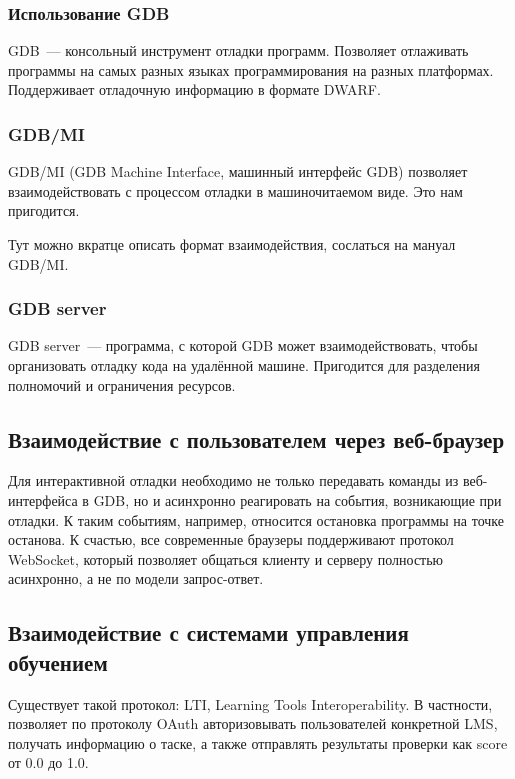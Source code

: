 \documentclass[a4paper,article,14pt]{extarticle}
\begin{document}
\subsubsection{Использование GDB}

GDB~--- консольный инструмент отладки программ. Позволяет отлаживать программы на самых разных языках программирования на разных платформах. Поддерживает отладочную информацию в формате DWARF.

\subsubsection{GDB/MI}

GDB/MI (GDB Machine Interface, машинный интерфейс GDB) позволяет взаимодействовать с процессом отладки в машиночитаемом виде. Это нам пригодится.

Тут можно вкратце описать формат взаимодействия, сослаться на мануал GDB/MI.

\subsubsection{GDB server}

GDB server~--- программа, с которой GDB может взаимодействовать, чтобы организовать отладку кода на удалённой машине. Пригодится для разделения полномочий и ограничения ресурсов.

\subsection{Взаимодействие с пользователем через веб-браузер}

Для интерактивной отладки необходимо не только передавать команды из веб-интерфейса в GDB, но и асинхронно реагировать на события, возникающие при отладки. К таким событиям, например, относится остановка программы на точке останова. К счастью, все современные браузеры поддерживают протокол WebSocket, который позволяет общаться клиенту и серверу полностью асинхронно, а не по модели запрос-ответ.

\subsection{Взаимодействие с системами управления обучением}

Существует такой протокол: LTI, Learning Tools Interoperability. В частности, позволяет по протоколу OAuth авторизовывать пользователей конкретной LMS, получать информацию о таске, а также отправлять результаты проверки как score от 0.0 до 1.0.
\end{document}
